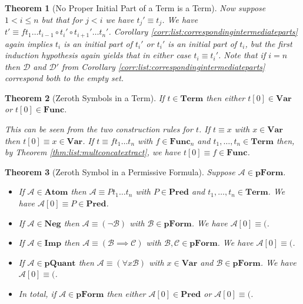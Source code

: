 \documentclass[12pt]{article}
\theoremstyle{break}
\theoremstyle{break}
\newtheorem{theorem}{Theorem}[section]
\theoremstyle{break}
\theoremstyle{break}
\theoremstyle{break}
\newtheorem{informal definition}[definition]{Informal Definition}
\newcommand{\mc}[1]{\mathcal{#1}}
\begin{document}
\begin{theorem}[No Proper Initial Part of a Term is a Term]
Now suppose $1<i \le n$ but that for $j<i$ we have $t_j' \equiv t_j$.
We have $t'\equiv f t_1\ldots t_{i-1} \circ t_i' \circ t_{i+1}'\ldots t_n'$.
Corollary \ref{corr:list:correspondingintermediateparts} again implies $t_i$ is an initial part of $t_i'$ or $t_i'$ is an initial part of $t_i$, but the first induction hypothesis again yields that in either case $t_i\equiv t_i'$. Note that if $i = n$ then $\mc{D}$ and $\mc{D}'$ from Corollary \ref{corr:list:correspondingintermediateparts} correspond both to the empty set.
\end{theorem}

\begin{theorem}[Zeroth Symbols in a Term]
\label{thm:read:zerothsymbterm}
If $t\in \textbf{Term}$ then either $t[0]\in\textbf{Var}$ or $t[0]\in\textbf{Func}$.

This can be seen from the two construction rules for $t$.
If $t\equiv x$ with $x\in\textbf{Var}$ then $t[0]\equiv x \in\textbf{Var}$.
If $t\equiv f t_1\ldots t_n$ with $f\in\textbf{Func}_n$ and $t_1,\ldots, t_n\in\textbf{Term}$ then, by Theorem \ref{thm:list:multconcatextract}, we have $t[0] \equiv f \in \textbf{Func}$.
\end{theorem}

\begin{theorem}[Zeroth Symbol in a Permissive Formula]
\label{thm:read:zerothsymbpform}
Suppose $\mc{A}\in\textbf{pForm}$.
\begin{itemize}
\item{If $\mc{A}\in\textbf{Atom}$ then $\mc{A}\equiv Pt_1\ldots t_n$ with $P\in\textbf{Pred}$ and $t_1,\ldots,t_n\in\textbf{Term}$. We have $\mc{A}[0] \equiv P \in \textbf{Pred}$.}
\item{If $\mc{A}\in\textbf{Neg}$ then $\mc{A}\equiv (\lnot \mc{B})$ with $\mc{B}\in\textbf{pForm}$. We have $\mc{A}[0] \equiv ($.}
\item{If $\mc{A}\in\textbf{Imp}$ then $\mc{A}\equiv(\mc{B}\implies \mc{C})$ with $\mc{B}, \mc{C} \in \textbf{pForm}$. We have $\mc{A}[0] \equiv ($.}
\item{If $\mc{A}\in\textbf{pQuant}$ then $\mc{A}\equiv (\forall x \mc{B})$ with $x\in\textbf{Var}$ and $\mc{B}\in\textbf{pForm}$. We have $\mc{A}[0] \equiv ($.}
\item{In total, if $\mc{A}\in\textbf{pForm}$ then either $\mc{A}[0] \in \textbf{Pred}$ or $\mc{A}[0] \equiv ($.}
\end{itemize}
\end{theorem}
\end{document}

